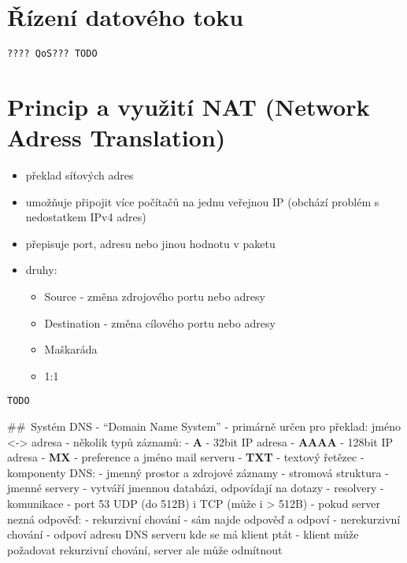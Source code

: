 \documentclass{szzclass}
\providecommand{\tightlist}{%
  \setlength{\itemsep}{0pt}\setlength{\parskip}{0pt}}
\begin{document}
\hypertarget{ux159uxedzenuxed-datovuxe9ho-toku}{%
\section{Řízení datového
toku}\label{ux159uxedzenuxed-datovuxe9ho-toku}}

\begin{verbatim}
???? QoS??? TODO
\end{verbatim}

\hypertarget{princip-a-vyuux17eituxed-nat-network-adress-translation}{%
\section{Princip a využití NAT (Network Adress
Translation)}\label{princip-a-vyuux17eituxed-nat-network-adress-translation}}

\begin{itemize}
\tightlist
\item
  překlad síťových adres
\item
  umožňuje připojit více počítačů na jednu veřejnou IP (obchází problém
  s nedostatkem IPv4 adres)
\item
  přepisuje port, adresu nebo jinou hodnotu v paketu
\item
  druhy:

  \begin{itemize}
  \tightlist
  \item
    Source - změna zdrojového portu nebo adresy
  \item
    Destination - změna cílového portu nebo adresy
  \item
    Maškaráda
  \item
    1:1
  \end{itemize}
\end{itemize}

\begin{verbatim}
TODO
\end{verbatim}

\#\#~Systém DNS - ``Domain Name System'' - primárně určen pro překlad:
jméno \textless-\textgreater{} adresa - několik typů záznamů: -
\textbf{A} - 32bit IP adresa - \textbf{AAAA} - 128bit IP adresa -
\textbf{MX} - preference a jméno mail serveru - \textbf{TXT} - textový
řetězec - komponenty DNS: - jmenný prostor a zdrojové záznamy - stromová
struktura - jmenné servery - vytváří jmennou databázi, odpovídají na
dotazy - resolvery - komunikace - port 53 UDP (do 512B) i TCP (může i
\textgreater{} 512B) - pokud server nezná odpověď: - rekurzivní chování
- sám najde odpověď a odpoví - nerekurzivní chování - odpoví adresu DNS
serveru kde se má klient ptát - klient může požadovat rekurzivní
chování, server ale může odmítnout
\end{document}
